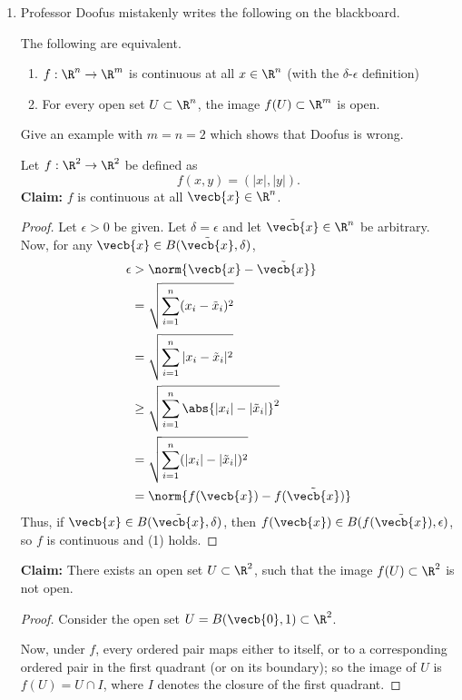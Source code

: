 \documentclass[letterpaper]{article}
\begin{document}
\begin{enumerate}
\item Professor Doofus mistakenly writes the following on the blackboard.
\begin{romantheorem*}The following are equivalent.
\begin{enumerate}[label=(\arabic*)]
	\item $f:\R^n \to \R^m$ is continuous at all $x \in \R^n$ (with the $\delta$-$\epsilon$ definition)
	\item For every open set $U \subset \R^n$, the image $f(U) \subset \R^m$ is open. 
\end{enumerate}
\end{romantheorem*}
Give an example with $m=n=2$ which shows that Doofus is wrong. 
\begin{example*}
Let $f:\R^2\to\R^2$ be defined as 
$$f(x,y) = (|x|, |y|).$$ 
\textbf{Claim:} $f$ is continuous at all $\vecb{x} \in \R^n$.
\begin{proof}
Let $\epsilon > 0$ be given. Let $\delta=\epsilon$ and let $\tilde{\vecb{x}} \in \R^n$ be arbitrary. Now, for any $\vecb{x} \in B(\tilde{\vecb{x}}, \delta)$, 
\[\begin{aligned}
\epsilon &> \norm{\vecb{x}-\tilde{\vecb{x}}}\\
&= \sqrt{\sum_{i=1}^n (x_i-\tilde{x}_i)^2}\\
&= \sqrt{\sum_{i=1}^n |x_i-\tilde{x}_i|^2}\\
&\geq \sqrt{\sum_{i=1}^n \abs{|x_i|-|\tilde{x}_i|}^2}\\
&= \sqrt{\sum_{i=1}^n (|x_i|-|\tilde{x}_i|)^2}\\
&= \norm{f(\vecb{x})-f(\tilde{\vecb{x}})}\\
\end{aligned}\]
Thus, if $\vecb{x} \in B(\tilde{\vecb{x}}, \delta)$, then $f(\vecb{x}) \in B(f(\tilde{\vecb{x}}), \epsilon)$, so $f$ is continuous and (1) holds. 
\end{proof}

\textbf{Claim:} There exists an open set $U \subset \R^2$, such that the image $f(U) \subset \R^2$ is not open.
\begin{proof}
Consider the open set $U=B(\vecb{0},1) \subset \R^2$. 



Now, under $f$, every ordered pair maps either to itself, or to a corresponding ordered pair in the first quadrant (or on its boundary); so the image of $U$ is $f(U)=U\cap I$, where $I$ denotes the closure of the first quadrant.


\end{proof}
\end{example*}
\end{enumerate}
\end{document}
